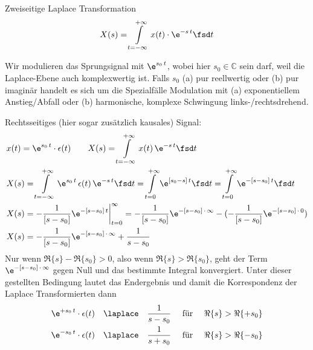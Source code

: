 \begin{Werkzeug}
Zweiseitige Laplace Transformation
\begin{align}
X(s) = \int\limits_{t=-\infty}^{+\infty} x(t) \cdot \e^{-s\,t} \fsd t
\end{align}
\end{Werkzeug}
\begin{Ansatz}
Wir modulieren das Sprungsignal mit $\e^{s_0 \, t}$, wobei hier
$s_0 \in \mathbb{C}$ sein darf, weil die Laplace-Ebene auch komplexwertig ist.
Falls $s_0$ (a) pur reellwertig oder (b) pur imaginär handelt es sich um die
Spezialfälle Modulation mit (a) exponentiellem Anstieg/Abfall oder (b)
harmonische, komplexe Schwingung links-/rechtsdrehend.
\end{Ansatz}

\begin{ExCalc}
Rechtsseitiges (hier sogar zusätzlich kausales) Signal:
\begin{align}
&x(t) = \e^{s_0 \, t} \cdot \epsilon(t) \qquad
X(s) = \int\limits_{t = -\infty}^{+\infty} x(t) \, \e^{-s\,t}  \fsd t\\
&X(s) = \int\limits_{t = -\infty}^{+\infty} \e^{s_0 \, t} \, \epsilon(t) \, \e^{-s\,t}  \fsd t
= \int\limits_{t = 0}^{+\infty} \e^{[s_0-s]\,t} \fsd t = \int\limits_{t = 0}^{+\infty} \e^{-[s-s_0]\,t} \fsd t\\
&X(s) = -\frac{1}{[s-s_0]}\e^{-[s-s_0]\,t}\bigg|_{t=0}^{\infty}=
-\frac{1}{[s-s_0]}\e^{-[s-s_0]\,\cdot\,\infty }
-(-\frac{1}{[s-s_0]}\e^{-[s-s_0]\,\cdot\,0})\\
&X(s) = -\frac{1}{[s-s_0]}\e^{-[s-s_0]\,\cdot\,\infty }
+\frac{1}{s-s_0}
\end{align}
Nur wenn $\Re\{s\}-\Re\{s_0\} > 0$, also wenn $\Re\{s\}>\Re\{s_0\}$, geht
der Term $\e^{-[s-s_0]\,\cdot\,\infty }$ gegen Null und das bestimmte Integral
konvergiert.
Unter dieser gestellten Bedingung lautet das Endergebnis und damit die
Korrespondenz der Laplace Transformierten dann
\begin{align}
\e^{+s_0 \, t} \cdot \epsilon(t) \quad \laplace \quad \frac{1}{s-s_0} \quad\text{ für } \quad\Re\{s\} > \Re\{+s_0\}\\
\e^{-s_0 \, t} \cdot \epsilon(t) \quad \laplace \quad \frac{1}{s+s_0} \quad\text{ für } \quad\Re\{s\} > \Re\{-s_0\}
\end{align}


\end{ExCalc}
